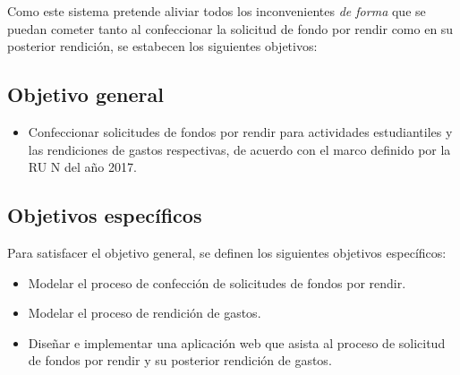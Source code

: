 Como este sistema pretende aliviar todos los inconvenientes \emph{de forma} que se puedan cometer tanto al confeccionar la solicitud de fondo por rendir como en su posterior rendición, se estabecen los siguientes objetivos:

\subsection{Objetivo general}
    \begin{itemize}
        \item Confeccionar solicitudes de fondos por rendir para actividades estudiantiles y las rendiciones de gastos respectivas, de acuerdo con el marco definido por la RU N del año 2017.
    \end{itemize}

\subsection{Objetivos específicos} 

Para satisfacer el objetivo general, se definen los siguientes objetivos específicos:

    \begin{itemize}
        \item Modelar el proceso de confección de solicitudes de fondos por rendir.

        \item Modelar el proceso de rendición de gastos.

        \item Diseñar e implementar una aplicación web que asista al proceso de solicitud de fondos por rendir y su posterior rendición de gastos.

    \end{itemize}
